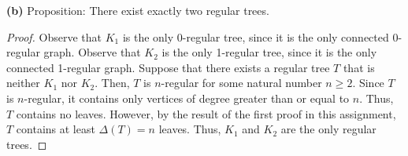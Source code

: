 \documentclass[12pt]{article}
\begin{document}
{\bf (b)} Proposition: There exist exactly two regular trees.
\begin{proof}
    Observe that $K_1$ is the only 0-regular tree, since it is the only connected 0-regular graph. %
    Observe that $K_2$ is the only 1-regular tree, since it is the only connected 1-regular graph. %
    Suppose that there exists a regular tree $T$ that is neither $K_1$ nor $K_2$.
    Then, $T$ is $n$-regular for some natural number $n \geq 2$.
    Since $T$ is $n$-regular, it contains only vertices of degree greater than or equal to $n$.
    Thus, $T$ contains no leaves.
    However, by the result of the first proof in this assignment, $T$ contains at least $\Delta(T) = n$ leaves.
    Thus, $K_1$ and $K_2$ are the only regular trees.
\end{proof}

\newpage{}

    
\end{document}
